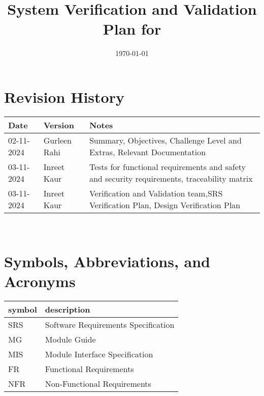 \documentclass[12pt, titlepage]{article}
\begin{document}
\title{System Verification and Validation Plan for \progname{}} 
\author{\authname}
\date{\today}
	
\maketitle


\section*{Revision History}

\begin{tabularx}{\textwidth}{p{3cm}p{2cm}X}
\toprule {\bf Date} & {\bf Version} & {\bf Notes}\\
\midrule
02-11-2024 & Gurleen Rahi & Summary, Objectives, Challenge Level and Extras, Relevant Documentation\\
03-11-2024 & Inreet Kaur & Tests for functional requirements and safety and security requirements, traceability matrix\\
03-11-2024 & Inreet Kaur & Verification and Validation team,SRS Verification Plan, Design Verification Plan\\

\bottomrule
\end{tabularx}

~\\

\newpage

\tableofcontents

\listoftables
{}

\listoffigures
{}

\newpage

\section{Symbols, Abbreviations, and Acronyms}

\renewcommand{\arraystretch}{1.2}
\begin{tabular}{l l} 
  \toprule		
  \textbf{symbol} & \textbf{description}\\
  \midrule 
  SRS & Software Requirements Specification\\
  MG & Module Guide\\
  MIS & Module Interface Specification\\
  FR & Functional Requirements\\
  NFR & Non-Functional Requirements\\
  \bottomrule
\end{tabular}\\
\end{document}
